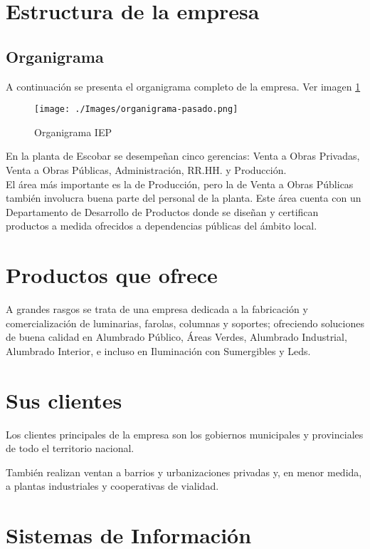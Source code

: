 \section{Estructura de la empresa}

\subsection{Organigrama}
A continuación se presenta el organigrama completo de la empresa. Ver imagen \ref{organigramaIEP}

\begin{figure}[h!]
  \centering
  \texttt{[image: ./Images/organigrama-pasado.png]}
  \caption{Organigrama IEP}\label{organigramaIEP}
\end{figure}

En la planta de Escobar se desempe\~nan cinco gerencias: Venta a Obras Privadas, Venta a Obras P\'ublicas, Administraci\'on, RR.HH. y Producci\'on. \\
El \'area m\'as importante es la de Producci\'on, pero la de Venta a Obras P\'ublicas tambi\'en involucra buena parte del personal de la planta. Este \'area cuenta con un Departamento de Desarrollo de Productos donde se dise\~nan y certifican productos a medida ofrecidos a dependencias p\'ublicas del \'ambito local.

\section{Productos que ofrece}
A grandes rasgos se trata de una empresa dedicada a la fabricaci\'on y comercializaci\'on de luminarias, farolas, columnas y soportes; ofreciendo soluciones de buena calidad en Alumbrado P\'ublico, \'Areas Verdes, Alumbrado Industrial, Alumbrado Interior, e incluso en Iluminaci\'on con Sumergibles y Leds.

\section{Sus clientes}
Los clientes principales de la empresa son los gobiernos municipales y provinciales de todo el territorio nacional.

Tambi\'en realizan ventan a barrios y urbanizaciones privadas y, en menor medida, a plantas industriales y cooperativas de vialidad.

\section{Sistemas de Informaci\'on}

